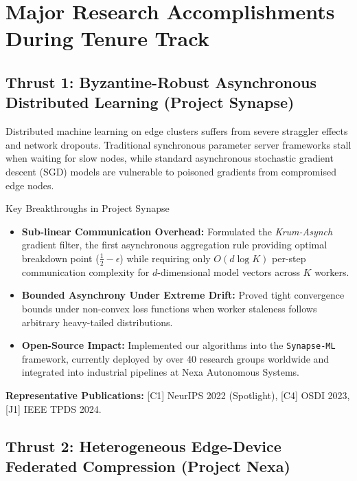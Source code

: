 \documentclass[11pt, a4paper, parskip=half]{scrartcl}
\begin{document}
\section{Major Research Accomplishments During Tenure Track}

\subsection{Thrust 1: Byzantine-Robust Asynchronous Distributed Learning (Project Synapse)}

Distributed machine learning on edge clusters suffers from severe straggler effects and network dropouts. Traditional synchronous parameter server frameworks stall when waiting for slow nodes, while standard asynchronous stochastic gradient descent (SGD) models are vulnerable to poisoned gradients from compromised edge nodes.

\begin{highlightbox}{Key Breakthroughs in Project Synapse}
\begin{itemize}
  \item \textbf{Sub-linear Communication Overhead:} Formulated the \textit{Krum-Asynch} gradient filter, the first asynchronous aggregation rule providing optimal breakdown point ($\frac{1}{2} - \epsilon$) while requiring only $O(d \log K)$ per-step communication complexity for $d$-dimensional model vectors across $K$ workers.
  \item \textbf{Bounded Asynchrony Under Extreme Drift:} Proved tight convergence bounds under non-convex loss functions when worker staleness follows arbitrary heavy-tailed distributions.
  \item \textbf{Open-Source Impact:} Implemented our algorithms into the \texttt{Synapse-ML} framework, currently deployed by over 40 research groups worldwide and integrated into industrial pipelines at Nexa Autonomous Systems.
\end{itemize}
\end{highlightbox}

\textbf{Representative Publications:} [C1] NeurIPS 2022 (Spotlight), [C4] OSDI 2023, [J1] IEEE TPDS 2024.

\subsection{Thrust 2: Heterogeneous Edge-Device Federated Compression (Project Nexa)}
\end{document}
